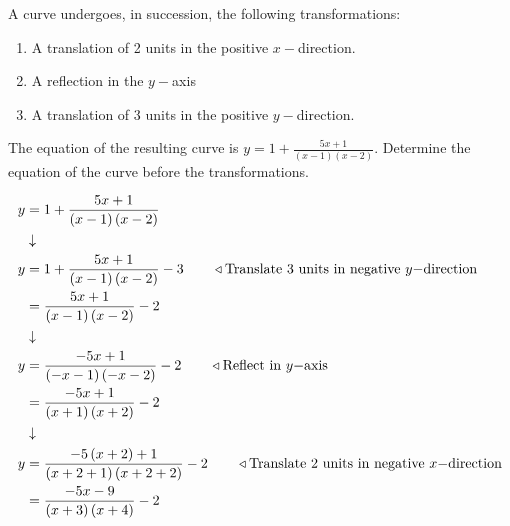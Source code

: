 \documentclass[11pt,a4paper]{book}
\begin{document}
\newpage

\begin{example}
A curve undergoes, in succession, the following transformations:

\begin{enumerate}[label=\textbf{(\roman*):}]

\item  A translation of 2 units in the positive $x-$direction.

\item  A reflection in the $y-$axis

\item  A translation of $3$ units in the positive $y-$direction.

\end{enumerate}

The equation of the resulting curve is ${\displaystyle y=1+\frac{5x+1}{\left(x-1\right)\left(x-2\right)}}$.
Determine the equation of the curve before the transformations.

\Solution
\begin{align*}
y & =1+\frac{5x+1}{\left(x-1\right)\left(x-2\right)}\\
 & \downarrow\\
y & =1+\frac{5x+1}{\left(x-1\right)\left(x-2\right)}-3\qquad\triangleleft\text{Translate 3 units in negative \ensuremath{y-}direction}\\
 & =\frac{5x+1}{\left(x-1\right)\left(x-2\right)}-2\\
 & \downarrow\\
y & =\frac{-5x+1}{\left(-x-1\right)\left(-x-2\right)}-2\qquad\triangleleft\text{Reflect in \ensuremath{y-}axis}\\
 & =\frac{-5x+1}{\left(x+1\right)\left(x+2\right)}-2\\
 & \downarrow\\
y & =\frac{-5\left(x+2\right)+1}{\left(x+2+1\right)\left(x+2+2\right)}-2\qquad\triangleleft\text{Translate 2 units in negative \ensuremath{x-}direction}\\
 & =\frac{-5x-9}{\left(x+3\right)\left(x+4\right)}-2
\end{align*}
\end{example}
\end{document}
